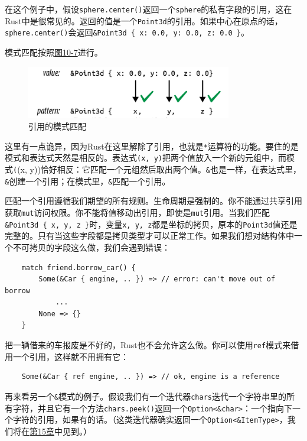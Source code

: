在这个例子中，假设\texttt{sphere.center()}返回一个\texttt{sphere}的私有字段的引用，这在Rust中是很常见的。返回的值是一个\texttt{Point3d}的引用。如果中心在原点的话，\texttt{sphere.center()}会返回\texttt{\&Point3d \{ x: 0.0, y: 0.0, z: 0.0 \}}。

模式匹配按照\hyperref[f10-7]{图10-7}进行。

\begin{figure}[htbp]
    \centering
    \includegraphics[width=0.8\textwidth]{../img/f10-7.png}
    \caption{引用的模式匹配}
    \label{f10-7}
\end{figure}

这里有一点诡异，因为Rust在这里解除了引用，也就是\texttt{*}运算符的功能。要住的是模式和表达式天然是相反的。表达式\texttt{(x, y)}把两个值放入一个新的元组中，而模式\texttt((x, y))恰好相反：它匹配一个元组然后取出两个值。\texttt{\&}也是一样，在表达式里，\texttt{\&}创建一个引用；在模式里，\texttt{\&}匹配一个引用。

匹配一个引用遵循我们期望的所有规则。生命周期是强制的。你不能通过共享引用获取\texttt{mut}访问权限。你不能将值移动出引用，即使是\texttt{mut}引用。当我们匹配\texttt{\&Point3d \{ x, y, z \}}时，变量\texttt{x, y, z}都是坐标的拷贝，原本的\texttt{Point3d}值还是完整的。只有当这些字段都是拷贝类型才可以正常工作。如果我们想对结构体中一个不可拷贝的字段这么做，我们会遇到错误：
\begin{verbatim}
    match friend.borrow_car() {
        Some(&Car { engine, .. }) => // error: can't move out of borrow
            ...
        None => {}
    }
\end{verbatim}

把一辆借来的车报废是不好的，Rust也不会允许这么做。你可以使用\texttt{ref}模式来借用一个引用，这样就不用拥有它：
\begin{verbatim}
    Some(&Car { ref engine, .. }) => // ok, engine is a reference
\end{verbatim}

再来看另一个\texttt{\&}模式的例子。假设我们有一个迭代器\texttt{chars}迭代一个字符串里的所有字符，并且它有一个方法\texttt{chars.peek()}返回一个\texttt{Option<\&char>}：一个指向下一个字符的引用，如果有的话。（这类迭代器确实返回一个\texttt{Option<\&ItemType>}，我们将在\hyperref[ch15]{第15章}中见到。）

